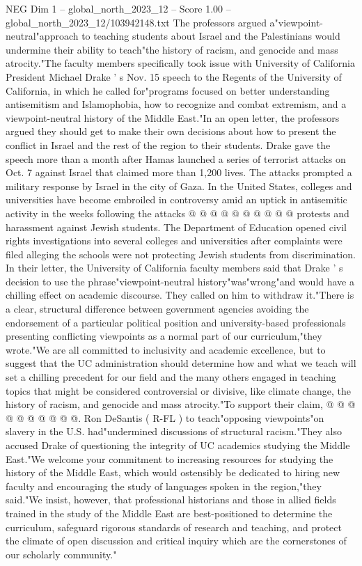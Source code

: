 \begin{textsample}{NEG Dim 1 – global\_north\_2023\_12 – Score 1.00 – global\_north\_2023\_12/103942148.txt}  \label{ex:f1_neg_361}
The professors argued a"viewpoint-neutral"approach to teaching students about Israel and the Palestinians would undermine their ability to teach"the history of racism, and genocide and mass atrocity."The faculty members specifically took issue with University of California President Michael Drake ' s Nov. 15 speech to the Regents of the University of California, in which he called for"programs focused on better understanding antisemitism and Islamophobia, how to recognize and combat extremism, and a viewpoint-neutral history of the Middle East."In an open letter, the professors argued they should get to make their own decisions about how to present the conflict in Israel and the rest of the region to their students.
Drake gave the speech more than a month after Hamas launched a series of terrorist attacks on Oct. 7 against Israel that claimed more than 1,200 lives.
The attacks prompted a military response by Israel in the city of Gaza.
In the United States, colleges and universities have become embroiled in controversy amid an uptick in antisemitic activity in the weeks following the attacks @ @ @ @ @ @ @ @ @ @ protests and harassment against Jewish students.
The Department of Education opened civil rights investigations into several colleges and universities after complaints were filed alleging the schools were not protecting Jewish students from discrimination.
In their letter, the University of California faculty members said that Drake ' s decision to use the phrase"viewpoint-neutral history"was"wrong"and would have a chilling effect on academic discourse.
They called on him to withdraw it."There is a clear, structural difference between government agencies avoiding the endorsement of a particular political position and university-based professionals presenting conflicting viewpoints as a normal part of our curriculum,"they wrote."We are all committed to inclusivity and academic excellence, but to suggest that the UC administration should determine how and what we teach will set a chilling precedent for our field and the many others engaged in teaching topics that might be considered controversial or divisive, like climate change, the history of racism, and genocide and mass atrocity."To support their claim, @ @ @ @ @ @ @ @ @ @.
Ron DeSantis ( R-FL ) to teach"opposing viewpoints"on slavery in the U.S. had"undermined discussions of structural racism."They also accused Drake of questioning the integrity of UC academics studying the Middle East."We welcome your commitment to increasing resources for studying the history of the Middle East, which would ostensibly be dedicated to hiring new faculty and encouraging the study of languages spoken in the region,"they said."We insist, however, that professional historians and those in allied fields trained in the study of the Middle East are best-positioned to determine the curriculum, safeguard rigorous standards of research and teaching, and protect the climate of open discussion and critical inquiry which are the cornerstones of our scholarly community."

\end{textsample}

